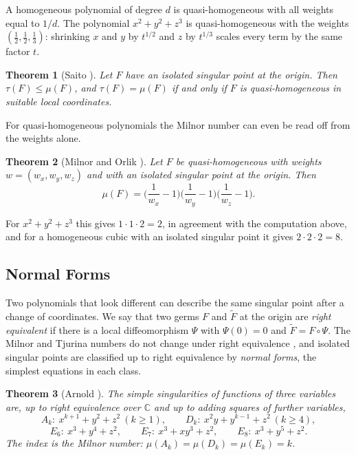 \documentclass[12pt, a4paper, oneside]{book}
\theoremstyle{plain}
\newtheorem{theorem}{Theorem}[chapter]
\theoremstyle{definition}
\theoremstyle{remark}
\theoremstyle{definition}
\begin{document}
A homogeneous polynomial of degree $d$ is quasi-homogeneous with all weights equal to $1/d$. The polynomial $x^2+y^2+z^3$ is quasi-homogeneous with the weights $(\tfrac12,\tfrac12,\tfrac13)$: shrinking $x$ and $y$ by $t^{1/2}$ and $z$ by $t^{1/3}$ scales every term by the same factor $t$.

\begin{theorem}[Saito \cite{saito1971quasihomogene}]
\label{thm:saito}
Let $F$ have an isolated singular point at the origin. Then $\tau(F)\le\mu(F)$, and $\tau(F)=\mu(F)$ if and only if $F$ is quasi-homogeneous in suitable local coordinates.
\end{theorem}

For quasi-homogeneous polynomials the Milnor number can even be read off from the weights alone.

\begin{theorem}[Milnor and Orlik \cite{milnor1970isolated}]
\label{thm:milnor-orlik}
Let $F$ be quasi-homogeneous with weights $w=(w_x,w_y,w_z)$ and with an isolated singular point at the origin. Then
\[
\mu(F)=\Big(\frac{1}{w_x}-1\Big)\Big(\frac{1}{w_y}-1\Big)\Big(\frac{1}{w_z}-1\Big).
\]
\end{theorem}

For $x^2+y^2+z^3$ this gives $1\cdot1\cdot2=2$, in agreement with the computation above, and for a homogeneous cubic with an isolated singular point it gives $2\cdot2\cdot2=8$.

\subsection{Normal Forms}

Two polynomials that look different can describe the same singular point after a change of coordinates. We say that two germs $F$ and $\tilde F$ at the origin are \emph{right equivalent} if there is a local diffeomorphism $\Psi$ with $\Psi(0)=0$ and $\tilde F=F\circ\Psi$. The Milnor and Tjurina numbers do not change under right equivalence \cite{greuel2007introduction}, and isolated singular points are classified up to right equivalence by \emph{normal forms}, the simplest equations in each class.

\begin{theorem}[Arnold \cite{arnold1985singularities}]
\label{thm:simple}
The simple singularities of functions of three variables are, up to right equivalence over $\mathbb{C}$ and up to adding squares of further variables,
\[
A_k:\ x^{k+1}+y^2+z^2\ (k\ge1),\qquad
D_k:\ x^2y+y^{k-1}+z^2\ (k\ge4),
\]
\[
E_6:\ x^3+y^4+z^2,\qquad E_7:\ x^3+xy^3+z^2,\qquad E_8:\ x^3+y^5+z^2 .
\]
The index is the Milnor number: $\mu(A_k)=\mu(D_k)=\mu(E_k)=k$.
\end{theorem}
\end{document}
